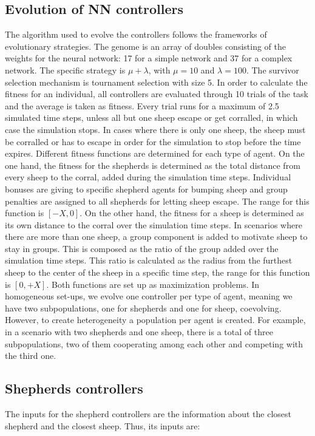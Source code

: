 \documentclass[conference]{IEEEtran}
\begin{document}
\subsection{Evolution of NN controllers}
The algorithm used to evolve the controllers follows the frameworks of evolutionary strategies. The genome is an array of doubles consisting of the weights for the neural network: 17 for a simple network and 37 for a complex network. The specific strategy is $\mu + \lambda$, with $\mu = 10$ and $\lambda = 100$. The survivor selection mechanism is tournament selection with size 5. 
In order to calculate the fitness for an individual, all controllers are evaluated through 10 trials of the task and the average is taken as fitness. Every trial runs for a maximum of 2.5 simulated time steps, unless all but one sheep escape or get corralled, in which case the simulation stops. In cases where there is only one sheep, the sheep must be corralled or has to escape in order for the simulation to stop before the time expires.
Different fitness functions are determined for each type of agent. On the one hand, the fitness for the shepherds is determined as the total distance from every sheep to the corral, added during the simulation time steps. Individual bonuses are giving to specific shepherd agents for bumping sheep and group penalties are assigned to all shepherds for letting sheep escape. The range for this function is $[-X, 0]$. 
On the other hand, the fitness for a sheep is determined as its own distance to the corral over the simulation time steps. In scenarios where there are more than one sheep, a group component is added to motivate sheep to stay in groups. This is composed as the ratio of the group added over the simulation time steps. This ratio is calculated as the radius from the furthest sheep to the center of the sheep in a specific time step, the range for this function is $[0, +X]$.
Both functions are set up as maximization problems. 
In homogeneous set-ups, we evolve one controller per type of agent, meaning we have two subpopulations, one for shepherds and one for sheep, coevolving. However, to create heterogeneity a population per agent is created. For example, in a scenario with two shepherds and one sheep, there is a total of three subpopulations, two of them cooperating among each other and competing with the third one.  

\subsection{Shepherds controllers}
The inputs for the shepherd controllers are the information about the closest shepherd and the closest sheep. Thus, its inputs are: 
\end{document}
